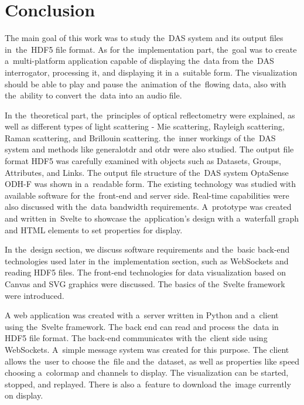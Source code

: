 \chapter*{Conclusion}
{}

The main goal of this work was to study the~DAS system and its output files in~the~HDF5 file format. As for the~implementation part, the~goal was to create a~multi-platform application capable of displaying the~data from the~DAS interrogator, processing it, and displaying it in a~suitable form. The visualization should be able to play and pause the~animation of the~flowing data, also with the~ability to convert the~data into an audio file.  

In the~theoretical part, the~principles of optical reflectometry were explained, as well as different types of light scattering - Mie scattering, Rayleigh scattering, Raman scattering, and Brillouin scattering. the~inner workings of the~DAS system and methods like \ac{generalotdr} and \ac{otdr} were also studied. The output file format HDF5 was carefully examined with objects such as Datasets, Groups, Attributes, and Links. The output file structure of the~DAS system OptaSense ODH-F was shown in a~readable form. The existing technology was studied with available software for the~front-end and server side. Real-time capabilities were also discussed with the~data bandwidth requirements. A~prototype was created and written in~Svelte to showcase the~application's design with a~waterfall graph and HTML elements to set properties for display. 

In the~design section, we discuss software requirements and the~basic back-end technologies used later in the~implementation section, such as WebSockets and reading HDF5 files. The front-end technologies for data visualization based on Canvas and SVG graphics were discussed. The basics of the~Svelte framework were introduced.

A web application was created with a~server written in Python and a~client using the~Svelte framework. The back end can read and process the~data in HDF5 file format. The back-end communicates with the~client side using WebSockets. A~simple message system was created for this purpose. The client allows the~user to choose the~file and the~dataset, as well as properties like speed choosing a~colormap and channels to display. The visualization can be started, stopped, and replayed. There is also a~feature to download the~image currently on display.

